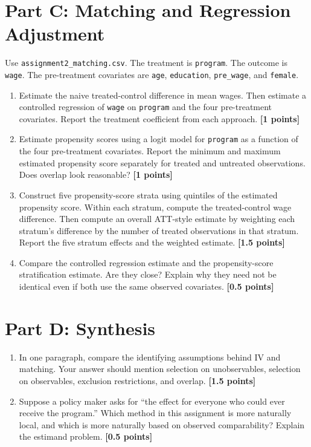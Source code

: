 \documentclass[11pt]{article}
\newcommand{\points}[1]{\hfill \textbf{[#1 points]}}
\begin{document}
\section*{Part C: Matching and Regression Adjustment}

Use \texttt{assignment2\_matching.csv}. The treatment is \texttt{program}. The outcome is \texttt{wage}. The pre-treatment covariates are \texttt{age}, \texttt{education}, \texttt{pre\_wage}, and \texttt{female}.

\begin{enumerate}[label=C\arabic*.]
  \item Estimate the naive treated-control difference in mean wages. Then estimate a controlled regression of \texttt{wage} on \texttt{program} and the four pre-treatment covariates. Report the treatment coefficient from each approach. \points{1}

  \item Estimate propensity scores using a logit model for \texttt{program} as a function of the four pre-treatment covariates. Report the minimum and maximum estimated propensity score separately for treated and untreated observations. Does overlap look reasonable? \points{1}

  \item Construct five propensity-score strata using quintiles of the estimated propensity score. Within each stratum, compute the treated-control wage difference. Then compute an overall ATT-style estimate by weighting each stratum's difference by the number of treated observations in that stratum. Report the five stratum effects and the weighted estimate. \points{1.5}

  \item Compare the controlled regression estimate and the propensity-score stratification estimate. Are they close? Explain why they need not be identical even if both use the same observed covariates. \points{0.5}
\end{enumerate}

\section*{Part D: Synthesis}

\begin{enumerate}[label=D\arabic*.]
  \item In one paragraph, compare the identifying assumptions behind IV and matching. Your answer should mention selection on unobservables, selection on observables, exclusion restrictions, and overlap. \points{1.5}

  \item Suppose a policy maker asks for ``the effect for everyone who could ever receive the program.'' Which method in this assignment is more naturally local, and which is more naturally based on observed comparability? Explain the estimand problem. \points{0.5}
\end{enumerate}
\end{document}
